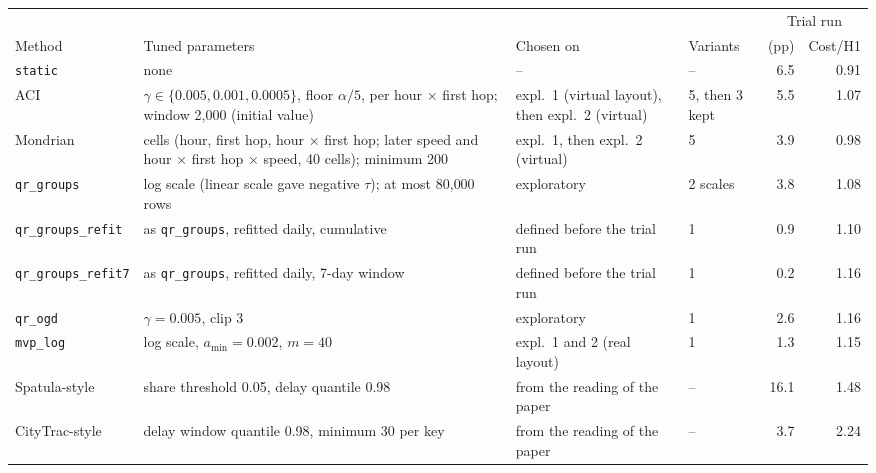 \setlength{\tabcolsep}{3pt}
\begin{tabular}{@{}lp{6.2cm}p{3.6cm}lrr@{}}
\toprule
 & & & & \multicolumn{2}{c}{Trial run} \\
\cmidrule(l){5-6}
Method & Tuned parameters & Chosen on & Variants & \Dbar{} (pp) & Cost/H1 \\
\midrule
\texttt{static} & none & -- & -- & 6.5 & 0.91 \\
ACI & $\gamma \in \{0.005, 0.001, 0.0005\}$, floor $\alpha/5$, per hour $\times$ first hop; window 2{,}000 (initial value) & expl.\ 1 (virtual layout), then expl.\ 2 (virtual) & 5, then 3 kept & 5.5 & 1.07 \\
Mondrian & cells (hour, first hop, hour $\times$ first hop; later speed and hour $\times$ first hop $\times$ speed, 40 cells); minimum 200 & expl.\ 1, then expl.\ 2 (virtual) & 5 & 3.9 & 0.98 \\
\texttt{qr\_groups} & log scale (linear scale gave negative $\tau$); at most 80{,}000 rows & exploratory & 2 scales & 3.8 & 1.08 \\
\texttt{qr\_groups\_refit} & as \texttt{qr\_groups}, refitted daily, cumulative & defined before the trial run & 1 & 0.9 & 1.10 \\
\texttt{qr\_groups\_refit7} & as \texttt{qr\_groups}, refitted daily, 7-day window & defined before the trial run & 1 & 0.2 & 1.16 \\
\texttt{qr\_ogd} & $\gamma = 0.005$, clip 3 & exploratory & 1 & 2.6 & 1.16 \\
\texttt{mvp\_log} & log scale, $a_{\min} = 0.002$, $m = 40$ & expl.\ 1 and 2 (real layout) & 1 & 1.3 & 1.15 \\
Spatula-style & share threshold 0.05, delay quantile 0.98 & from the reading of the paper & -- & 16.1 & 1.48 \\
CityTrac-style & delay window quantile 0.98, minimum 30 per key & from the reading of the paper & -- & 3.7 & 2.24 \\

\end{tabular}

